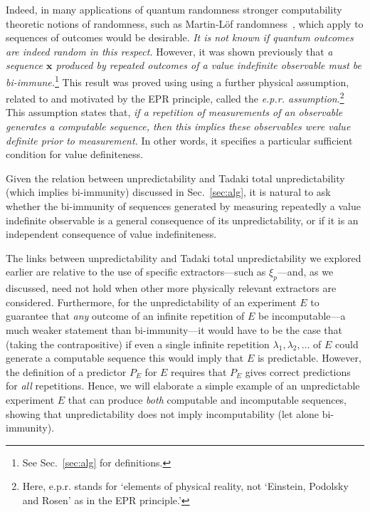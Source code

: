 \documentclass[%
 superscriptaddress,
 preprint,
 showpacs,
 showkeys,
 preprintnumbers,
 nofootinbib,
  amsmath,amssymb,
  aps,
 pra,
  longbibliography,
  floatfix,
 ]{revtex4-1}
\theoremstyle{definition}
\newcommand{\x}{\mathbf{x}}
\begin{document}
Indeed, in many applications of quantum randomness stronger computability theoretic notions of randomness, such as Martin-L\"of randomness~\cite{calude:02}, which apply to sequences of outcomes would be desirable.
\emph{It is not known if quantum outcomes are indeed random in this respect.}
However, it was shown previously \cite{svozil-2006-ran,2012-incomput-proofsCJ} that \emph{a sequence $\x$ produced by repeated outcomes of a value indefinite observable must be bi-immune.}\footnote{See Sec.~\ref{sec:alg} for definitions.} %
This result was proved using using a further physical assumption, related to and motivated by the EPR principle, called the \emph{e.p.r. assumption}.\footnote{Here, e.p.r. stands for `elements of physical reality, not `Einstein, Podolsky and Rosen' as in the EPR principle.'} 
This assumption states that, \emph{if a repetition of measurements of an observable generates a computable sequence, then this implies these observables were value definite prior to measurement.}
In other words, it specifies a particular sufficient condition for value definiteness.

Given the relation between unpredictability and Tadaki total unpredictability (which implies bi-immunity) discussed in Sec.~\ref{sec:alg}, it is natural to ask whether the bi-immunity of sequences generated by measuring repeatedly a value indefinite observable %
 is a general consequence of its unpredictability, or if it is an independent consequence of value indefiniteness.

The links between unpredictability and Tadaki total unpredictability we explored earlier are relative to the use of specific extractors---such as $\xi_p$---and, as we discussed, need not hold when other more physically relevant extractors are considered.
Furthermore, for the unpredictability of an experiment $E$ to guarantee that \emph{any} outcome of an infinite repetition of $E$ be incomputable---a much weaker statement than bi-immunity---it would have to be the case that (taking the contrapositive) if even a single infinite repetition $\lambda_1,\lambda_2,\dots$ of $E$ could generate a computable sequence this would imply that $E$ is predictable.
However, the definition of a predictor $P_E$ for $E$ requires that $P_E$  gives correct predictions for \emph{all} repetitions.
Hence, we will elaborate a simple example of an unpredictable experiment $E$ that can produce \emph{both} computable and incomputable sequences, showing that unpredictability does not imply incomputability (let alone bi-immunity).
\end{document}
